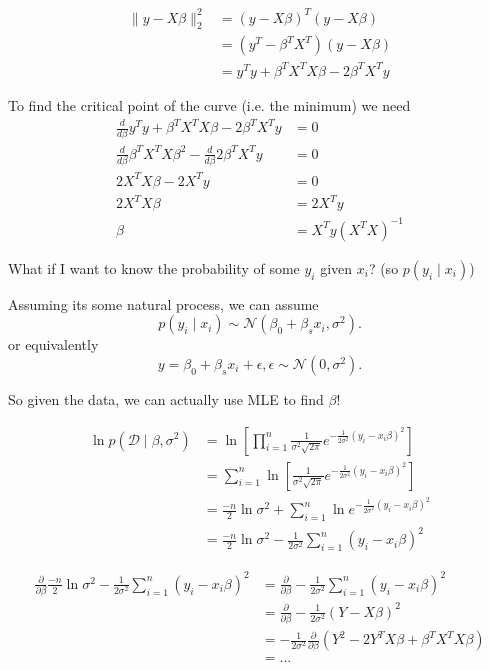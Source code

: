\begin{align*}
\|y-X\beta\|^2_2 & = (y-X\beta)^T(y-X\beta)\\
& =  (y^T-\beta^TX^T)(y-X\beta)\\
& = y^Ty + \beta^TX^TX\beta - 2 \beta^TX^Ty
\end{align*}

To find the critical point of the curve (i.e. the minimum) we need
\begin{align*}
\frac{d}{d\beta} y^Ty + \beta^TX^TX\beta - 2 \beta^TX^Ty &= 0\\
\frac{d}{d\beta}\beta^TX^TX\beta^2  - \frac{d}{d\beta}2 \beta^TX^Ty &= 0\\
2 X^TX\beta - 2 X^Ty &=0\\
2 X^TX\beta &= 2 X^Ty \\
\beta &= X^Ty(X^TX)^{-1}
\end{align*}

What if I want to know the probability of some $y_i$ given $x_i$? (so $p(y_i\mid x_i)$)

Assuming its some natural process, we can assume 
\[p(y_i\mid x_i) \sim \mathcal{N}(\beta_0 + \beta_s x_i, \sigma^2).\]
or equivalently
\[y= \beta_0 + \beta_s x_i + \epsilon, \epsilon \sim \mathcal{N}(0,\sigma^2).\]

So given the data, we can actually use MLE to find $\beta$!

\begin{align*}
\ln p(\mathcal{D}\mid \beta, \sigma^2) &= \ln \left[\prod_{i=1}^{n} \frac{1}{\sigma^2\sqrt{2\pi}} e^{-\frac{1}{2\sigma^2}(y_i-x_i\beta)^2}\right]\\
	&= \sum_{i=1}^{n} \ln \left[\frac{1}{\sigma^2\sqrt{2\pi}} e^{-\frac{1}{2\sigma^2}(y_i-x_i\beta)^2}\right]\\
	&=  \frac{-n}{2}\ln \sigma^2 + \sum_{i=1}^{n} \ln e^{-\frac{1}{2\sigma^2}(y_i-x_i\beta)^2}\\
	&= \frac{-n}{2}\ln \sigma^2 -\frac{1}{2\sigma^2}\sum_{i=1}^{n} (y_i-x_i\beta)^2
\end{align*}

\begin{align*}
\frac{\partial}{\partial\beta} \frac{-n}{2}\ln \sigma^2 -\frac{1}{2\sigma^2}\sum_{i=1}^{n} (y_i-x_i\beta)^2 &= \frac{\partial}{\partial\beta} -\frac{1}{2\sigma^2}\sum_{i=1}^{n} (y_i-x_i\beta)^2\\
&=  \frac{\partial}{\partial\beta} -\frac{1}{2\sigma^2} (Y-X\beta)^2\\
&= -\frac{1}{2\sigma^2}  \frac{\partial}{\partial\beta} (Y^2-2Y^TX\beta+\beta^TX^TX\beta)\\
&= ... \\
\end{align*}

